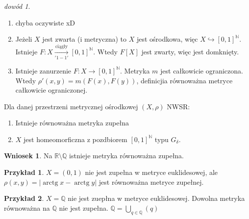 \documentclass[twoside,10pt]{article}
\theoremstyle{definition}
\theoremstyle{definition}
\theoremstyle{definition}
\theoremstyle{definition}
\theoremstyle{remark}
\newtheorem*{dd}{dowód}
\theoremstyle{definition}
\theoremstyle{definition}
\newtheorem*{wn}{Wniosek}
\theoremstyle{definition}
\theoremstyle{definition}
\newtheorem*{prz}{Przykład}
\theoremstyle{definition}
\theoremstyle{definition}
\begin{document}
\begin{dd} 
    \begin{enumerate}[(1)] 
        \item chyba oczywiste xD
        \item Jeżeli $X$ jest zwarta (i metryczna) to $X$ jest ośrodkowa, więc $X \hookrightarrow [0,1]^\mathbb{N}$. \\ 
            Istnieje $F: X \underset{'1-1'}{\xrightarrow{\text{ciągły}}} [0,1]^\mathbb{N}$. Wtedy 
            $F[X]$ jest zwarty, więc jest domknięty.
        \item Istnieje zanurzenie $F: X \to [0,1]^\mathbb{N}$. Metryka $m$ jest całkowicie ograniczona. \\ 
            Wtedy $\rho' (x,y) = m(F(x),F(y))$, definicjia równoważna metryce całkowicie ograniczonej.
    \end{enumerate} 
\end{dd} 
\begin{tw}[tw. Aleksandrowa]
    Dla danej przestrzeni metrycznej ośrodkowej $(X,\rho)$ NWSR: 
    \begin{enumerate}[(1)]
        \item Istnieje równoważna metryka zupełna
        \item $X$ jest homeomorficzna z pozdbiorem $[0,1]^\mathbb{N}$ typu $G_\delta$.
    \end{enumerate} 
\end{tw}
\begin{wn} Na $\mathbb{R} \setminus \mathbb{Q}$ istnieje metryka równoważna zupełna. \end{wn} 
\begin{prz} 
    $X = (0,1)$ nie jest zupełna w metryce euklidesowej, ale $\rho (x,y) = | \operatorname{arctg} x - \operatorname{arctg} y|$ jest 
    równoważna metryce zupełnej.
\end{prz} 
\begin{prz} 
    $X = \mathbb{Q}$ nie jest zuepłna w metryce euklidesowej. Dowolna metryka równoważna na $\mathbb{Q}$ nie jest zupełna. 
    $\mathbb{Q} = \bigcup\limits_{q \in \mathbb{Q}} (q)$
\end{prz}
\end{document}

